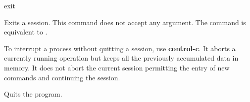 
\begin{command}{exit}{} 

\syntax{\obligatory{()}}

\begin{poydescription}
Exits a \poy session. This command does not accept any argument.
The  command is equivalent to .

\begin{statement}
To interrupt a process without quitting a \poy session, use {\bf control-c}.
It aborts a currently running operation but keeps all the previously accumulated
data in memory. It does not abort the current session permitting the entry of new
commands and continuing the session.
\end{statement}

\end{poydescription}

\begin{poyexamples}
{Quits the program.}
\end{poyexamples}

\begin{poyalso}
\end{poyalso}

\end{command}


